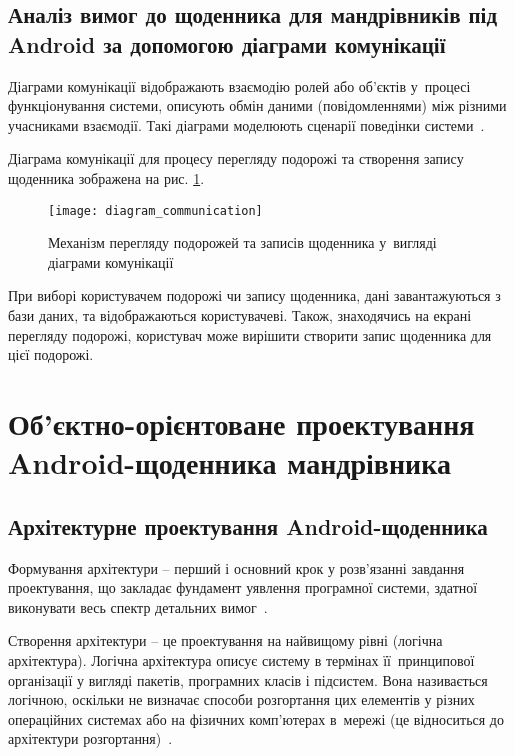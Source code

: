 \documentclass[../main.tex]{subfiles}
\begin{document}
\subsection{Аналіз вимог до щоденника для мандрівників під Android за допомогою діаграми комунікації}
Діаграми комунікації відображають взаємодію ролей або об'єктів у~процесі функціонування системи, описують обмін даними (повідомленнями) між різними учасниками взаємодії. Такі діаграми моделюють сценарії поведінки системи~\cite{diploma_guidelines}. 

Діаграма комунікації для процесу перегляду подорожі та створення запису щоденника зображена на рис. \ref{diagram:communication}.

\begin{figure}[H]
	\centering
	\texttt{[image: diagram\_communication]}
	\caption{Механізм перегляду подорожей та записів щоденника у~вигляді діаграми комунікації}
	\label{diagram:communication}
\end{figure}

При виборі користувачем подорожі чи запису щоденника, дані завантажуються з бази даних, та відображаються користувачеві. Також, знаходячись на екрані перегляду подорожі, користувач може вирішити створити запис щоденника для цієї подорожі.

\section{Об’єктно-орієнтоване проектування Android-щоденника мандрівника} %

\subsection{Архітектурне проектування Android-щоденника} %
Формування архітектури – перший і основний крок у розв’язанні завдання проектування, що закладає фундамент уявлення програмної системи, здатної виконувати весь спектр детальних вимог~\cite{diploma_guidelines2}.

Створення архітектури – це проектування на найвищому рівні (логічна архітектура). Логічна архітектура описує систему в термінах її~принципової організації у вигляді пакетів, програмних класів і підсистем. Вона називається логічною, оскільки не визначає способи розгортання цих елементів у різних операційних системах або на фізичних комп’ютерах в~мережі (це відноситься до архітектури розгортання)~\cite{diploma_guidelines}.
\end{document}
